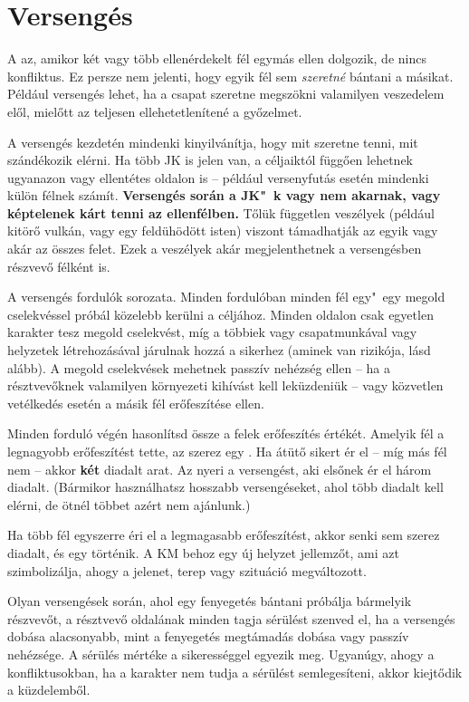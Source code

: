 \section{Versengés}

A  az, amikor két vagy több ellenérdekelt fél egymás ellen dolgozik, de nincs konfliktus. Ez persze nem jelenti, hogy egyik fél sem \emph{szeretné} bántani a másikat. Például versengés lehet, ha a csapat szeretne megszökni valamilyen veszedelem elől, mielőtt az teljesen ellehetetlenítené a győzelmet.

A versengés kezdetén mindenki kinyilvánítja, hogy mit szeretne tenni, mit szándékozik elérni. Ha több JK is jelen van, a céljaiktól függően lehetnek ugyanazon vagy ellentétes oldalon is -- például versenyfutás esetén mindenki külön félnek számít. \textbf{Versengés során a JK"~k vagy nem akarnak, vagy képtelenek kárt tenni az ellenfélben.} Tőlük független veszélyek (például kitörő vulkán, vagy egy feldühödött isten) viszont támadhatják az egyik vagy akár az összes felet. Ezek a veszélyek akár megjelenthetnek a versengésben részvevő félként is.

A versengés fordulók sorozata. Minden fordulóban minden fél egy"~egy megold cselekvéssel próbál közelebb kerülni a céljához. Minden oldalon csak egyetlen karakter tesz megold cselekvést, míg a többiek vagy csapatmunkával vagy helyzetek létrehozásával járulnak hozzá a sikerhez (aminek van rizikója, lásd alább). A megold cselekvések mehetnek passzív nehézség ellen -- ha a résztvevőknek valamilyen környezeti kihívást kell leküzdeniük -- vagy közvetlen vetélkedés esetén a másik fél erőfeszítése ellen.

Minden forduló végén hasonlítsd össze a felek erőfeszítés értékét. Amelyik fél a legnagyobb erőfeszítést tette, az szerez egy . Ha átütő sikert ér el -- míg más fél nem -- akkor \textbf{két} diadalt arat. Az nyeri a versengést, aki elsőnek ér el három diadalt. (Bármikor használhatsz hosszabb versengéseket, ahol több diadalt kell elérni, de ötnél többet azért nem ajánlunk.)

Ha több fél egyszerre éri el a legmagasabb erőfeszítést, akkor senki sem szerez diadalt, és egy  történik. A KM behoz egy új helyzet jellemzőt, ami azt szimbolizálja, ahogy a jelenet, terep vagy szituáció megváltozott.

Olyan versengések során, ahol egy fenyegetés bántani próbálja bármelyik részvevőt, a résztvevő oldalának minden tagja sérülést szenved el, ha a versengés dobása alacsonyabb, mint a fenyegetés megtámadás dobása vagy passzív nehézsége. A sérülés mértéke a sikerességgel egyezik meg. Ugyanúgy, ahogy a konfliktusokban, ha a karakter nem tudja a sérülést semlegesíteni, akkor kiejtődik a küzdelemből.

